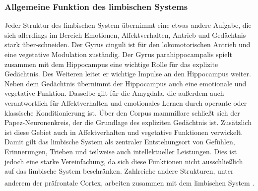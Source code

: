 \subsubsection*{Allgemeine Funktion des limbischen Systems}
Jeder Struktur des limbischen System übernimmt eine etwas andere Aufgabe, die sich allerdings im Bereich Emotionen, Affektverhalten, Antrieb und Gedächtnis stark über-schneiden. Der Gyrus cinguli ist für den lokomotorischen Antrieb und eine vegetative Modulation zuständig. Der Gyrus parahippocampalis spielt zusammen mit dem Hippocampus eine wichtige Rolle für das explizite Gedächtnis. Des Weiteren leitet er wichtige Impulse an den Hippocampus weiter. Neben dem Gedächtnis übernimmt der Hippocampus auch eine emotionale und vegetative Funktion. Dasselbe gilt für die Amygdala, die außerdem auch verantwortlich für Affektverhalten und emotionales Lernen durch operante oder klassische Konditionierung ist. Über den Corpus mammillare schließt sich der Papez-Neuronenkreis, der die Grundlage des expliziten Gedächtnis ist. Zusätzlich ist diese Gebiet auch in Affektverhalten und vegetative Funktionen verwickelt. Damit gilt das limbische System als zentraler Entstehungsort von Gefühlen, Erinnerungen, Trieben und teilweise auch intellektueller Leistungen. Dies ist jedoch eine starke Vereinfachung, da sich diese Funktionen nicht ausschließlich auf das limbische System beschränken. Zahlreiche andere Strukturen, unter anderem der präfrontale Cortex, arbeiten zusammen mit dem limbischen System \textsuperscript{\cite[Kap.~9]{trepel2011neuroanatomie}}.    

